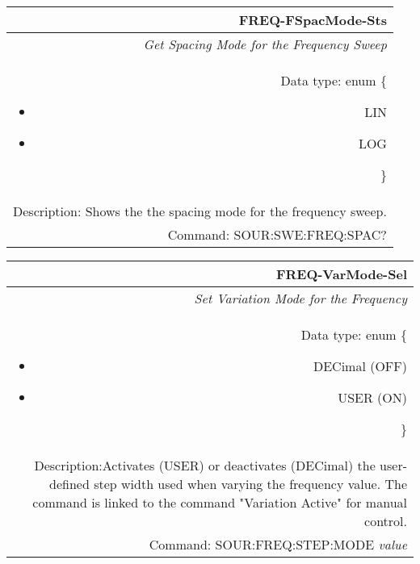 \documentclass[openany]{article}
\begin{document}
		\begin{tabular}{N}
			\hline
			\bfseries FREQ-FSpacMode-Sts \\ \hline
			\emph{Get Spacing Mode for the Frequency Sweep} \\
			Data type: enum \{\begin{itemize}[noitemsep]
				\small
				\item[] LIN
				\item[] LOG
			\end{itemize}\} \\ 
			Description: Shows the the spacing mode for the frequency sweep. \\
			Command: SOUR:SWE:FREQ:SPAC? \\

		\end{tabular}
%
		\begin{tabular}{N}
			\hline
			\bfseries FREQ-VarMode-Sel \\ \hline
			\emph{Set Variation Mode for the Frequency} \\
			Data type: enum \{\begin{itemize}[noitemsep]
				\small
				\item[] DECimal (OFF)
				\item[] USER (ON)
			\end{itemize}\} \\
			Description:Activates (USER) or deactivates (DECimal) the user-defined step width used when varying the frequency value. The command is linked to the command "Variation Active" for manual control. \\
			Command: SOUR:FREQ:STEP:MODE \emph{value} \\

		\end{tabular}
\end{document}
